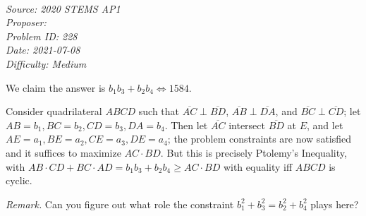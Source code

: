 \SSbreak\\
\emph{Source: 2020 STEMS AP1}\\
\emph{Proposer: \Pnjoy}\\ %
\emph{Problem ID: 228}\\
\emph{Date: 2021-07-08}\\
\emph{Difficulty: Medium}\\
\SSbreak

\bigskip

\begin{solution}\hfil\medskip
  
    We claim the answer is $b_1b_3 + b_2b_4 \iff \boxed{1584}$. \medskip

    Consider quadrilateral $ABCD$ such that $\overline{AC} \perp \overline{BD}$, $\overline{AB} \perp \overline{DA}$, and $\overline{BC} \perp \overline{CD}$; let $AB = b_1, BC = b_2, CD = b_3, DA = b_4$. 
    Then let $\overline{AC}$ intersect $\overline{BD}$ at $E$, and let $AE = a_1, BE = a_2, CE = a_3, DE = a_4$; the problem constraints are now satisfied and it 
    suffices to maximize $AC \cdot BD$. But this is precisely Ptolemy's Inequality, with $AB \cdot CD + BC \cdot AD = b_1b_3 + b_2b_4 \geq AC \cdot BD$ with equality iff $ABCD$ is cyclic. \medskip
    
    \textit{Remark.} Can you figure out what role the constraint $b_1^2 + b_3^2 = b_2^2 + b_4^2$ plays here?
\end{solution}\bigskip
